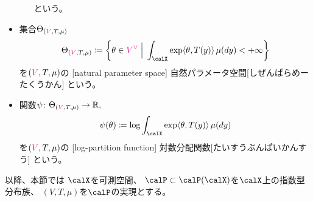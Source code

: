 \documentclass[report]{jlreq}
\begin{document}
\begin{definition}[指数型分布族]
\begin{itemize}
\begin{itemize}
                    という。
            \end{itemize}
        \item 集合$\Theta_{(\textcolor{magenta}{V}, T, \mu)}$
            \begin{equation}
                \Theta_{(\highlight{V}, T, \mu)}
                    \coloneqq \mybrace{
                        \theta \in \highlight{V^\vee}
                        \;\Big|\;
                        \int_\calX \exp \langle \theta, T(y) \rangle \, \mu(dy) < +\infty
                    }
            \end{equation}
            を$(\textcolor{magenta}{V}, T, \mu)$の
            [natural parameter space]
            {自然パラメータ空間}[しぜんぱらめーたくうかん]
            という。
        \item 関数$\psi \colon \Theta_{(\textcolor{magenta}{V}, T, \mu)} \to \mathbb{R},$
            \begin{equation}
                \psi(\theta)
                    \coloneqq
                    \log \int_\calX \exp \langle \theta, T(y) \rangle \, \mu(dy)
            \end{equation}
            を$(\textcolor{magenta}{V}, T, \mu)$の
            [log-partition function]
            {対数分配関数}[たいすうぶんぱいかんすう]
            という。
    \end{itemize}
\end{definition}

以降、本節では
$\calX$を可測空間、
$\calP \subset \calP(\calX)$を$\calX$上の指数型分布族、
$(V, T, \mu)$を$\calP$の実現とする。

\end{document}
